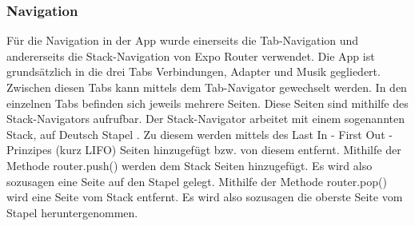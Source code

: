 \documentclass[]{article}
\begin{document}
\subsubsection{Navigation}
Für die Navigation in der App wurde einerseits die Tab-Navigation und andererseits die Stack-Navigation von Expo Router verwendet. Die App ist grundsätzlich in die drei Tabs Verbindungen, Adapter und Musik gegliedert. Zwischen diesen Tabs kann mittels dem Tab-Navigator gewechselt werden. In den einzelnen Tabs befinden sich jeweils mehrere Seiten. Diese Seiten sind mithilfe des Stack-Navigators aufrufbar. Der Stack-Navigator arbeitet mit einem sogenannten Stack, auf Deutsch \glqq Stapel \grqq{}. Zu diesem werden mittels des Last In - First Out - Prinzipes (kurz LIFO) Seiten hinzugefügt bzw. von diesem entfernt. Mithilfe der Methode router.push() werden dem Stack Seiten hinzugefügt. Es wird also sozusagen eine Seite auf den Stapel gelegt. Mithilfe der Methode router.pop() wird eine Seite vom Stack entfernt. Es wird also sozusagen die oberste Seite vom Stapel heruntergenommen.
\end{document}
